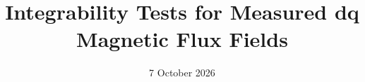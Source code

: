 \title{Integrability Tests for Measured dq Magnetic Flux Fields}
\author{}
\date{7 October 2026}
\newcommand{\PaperAbstract}{Can a measured dq flux field be the gradient of one magnetic co-energy potential? Reciprocity and closed-loop circulation provide local and global tests, while reflection symmetry is a separate restriction. We derive these tests and their coordinate dependence, then evaluate portable PSM measurements using a piecewise-affine field. Exact segment integration is checked against independently clipped triangle curl integrals. Nonzero path disagreement persists without quadrature error, whereas local derivative metrics are strongly sensitive to triangle geometry. The result concerns the reconstructed terminal-current field; it neither identifies the cause nor disproves conservative storage in other conjugate coordinates.}
\newif\ifshowglossary\showglossarytrue
\newif\ifshowbibliography\showbibliographytrue
